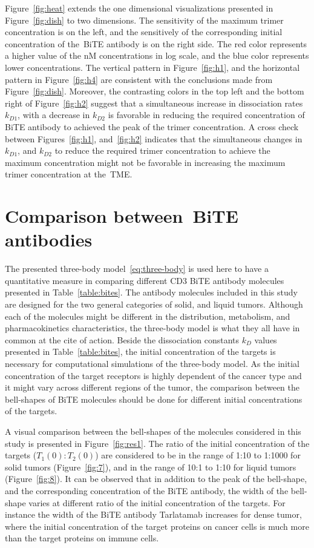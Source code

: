 Figure~\ref{fig:heat} extends the one dimensional visualizations presented in Figure~\ref{fig:dish} to two dimensions. The sensitivity of the maximum trimer concentration is on the left, and the sensitively of the corresponding initial concentration of the~\ac{BiTE} antibody is on the right side. The red color represents a higher value of the nM concentrations in log scale, and the blue color represents lower concentrations. The vertical pattern in Figure~\ref{fig:h1}, and the horizontal pattern in Figure~\ref{fig:h4} are consistent with the conclusions made from Figure~\ref{fig:dish}. Moreover, the contrasting colors in the top left and the bottom right of Figure~\ref{fig:h2} suggest that a simultaneous increase in dissociation rates $k_{D1}$, with a decrease in $k_{D2}$ is favorable in reducing the required concentration of \ac{BiTE} antibody to achieved the peak of the trimer concentration. A cross check between Figures~\ref{fig:h1}, and~\ref{fig:h2} indicates that the simultaneous changes in $k_{D1}$, and $k_{D2}$ to reduce the required trimer concentration to achieve the maximum concentration might not be favorable in increasing the maximum trimer concentration at the~\ac{TME}.

\section{Comparison between~\ac{BiTE} antibodies}

The presented three-body model~\ref{eq:three-body} is used here to have a quantitative measure in comparing different CD3 \ac{BiTE} antibody molecules presented in Table~\ref{table:bites}. The antibody molecules included in this study are designed for the two general categories of solid, and liquid tumors. Although each of the molecules might be different in the distribution, metabolism, and pharmacokinetics characteristics, the three-body model is what they all have in common at the cite of action. Beside the dissociation constants $k_D$ values presented in Table~\ref{table:bites}, the initial concentration of the targets is necessary for computational simulations of the three-body model. As the initial concentration of the target receptors is highly dependent of the cancer type and it might vary across different regions of the tumor, the comparison between the bell-shapes of \ac{BiTE} molecules should be done for different initial concentrations of the targets.

A visual comparison between the bell-shapes of the molecules considered in this study is presented in Figure~\ref{fig:res1}. The ratio of the initial concentration of the targets ($T_1(0):T_2(0)$) are considered to be in the range of 1:10 to 1:1000 for solid tumors (Figure~\ref{fig:7}), and in the range of 10:1 to 1:10 for liquid tumors (Figure~\ref{fig:8}). It can be observed that in addition to the peak of the bell-shape, and the corresponding concentration of the \ac{BiTE} antibody, the width of the bell-shape varies at different ratio of the initial concentration of the targets. For instance the width of the \ac{BiTE} antibody Tarlatamab increases for dense tumor, where the initial concentration of the target proteins on cancer cells is much more than the target proteins on immune cells. 

